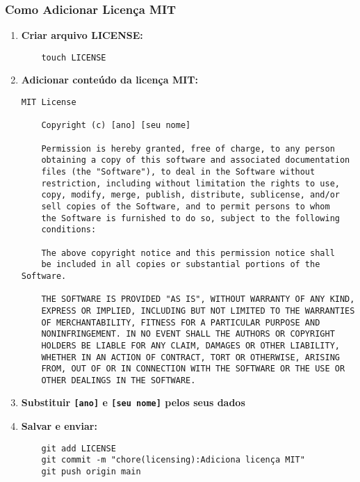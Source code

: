 \subsubsection{Como Adicionar Licença MIT}
\begin{enumerate}
    \item \textbf{Criar arquivo LICENSE:}
    \begin{verbatim}
    touch LICENSE
    \end{verbatim}
    
    \item \textbf{Adicionar conteúdo da licença MIT:}
    \begin{lstlisting}[caption={Licença MIT},label=lst:mit-license]
    MIT License

    Copyright (c) [ano] [seu nome]

    Permission is hereby granted, free of charge, to any person 
    obtaining a copy of this software and associated documentation 
    files (the "Software"), to deal in the Software without 
    restriction, including without limitation the rights to use, 
    copy, modify, merge, publish, distribute, sublicense, and/or 
    sell copies of the Software, and to permit persons to whom 
    the Software is furnished to do so, subject to the following 
    conditions:

    The above copyright notice and this permission notice shall 
    be included in all copies or substantial portions of the Software.

    THE SOFTWARE IS PROVIDED "AS IS", WITHOUT WARRANTY OF ANY KIND, 
    EXPRESS OR IMPLIED, INCLUDING BUT NOT LIMITED TO THE WARRANTIES 
    OF MERCHANTABILITY, FITNESS FOR A PARTICULAR PURPOSE AND 
    NONINFRINGEMENT. IN NO EVENT SHALL THE AUTHORS OR COPYRIGHT 
    HOLDERS BE LIABLE FOR ANY CLAIM, DAMAGES OR OTHER LIABILITY, 
    WHETHER IN AN ACTION OF CONTRACT, TORT OR OTHERWISE, ARISING 
    FROM, OUT OF OR IN CONNECTION WITH THE SOFTWARE OR THE USE OR 
    OTHER DEALINGS IN THE SOFTWARE.
    \end{lstlisting}
    
    \item \textbf{Substituir \texttt{[ano]} e \texttt{[seu nome]} pelos seus dados}
    
    \item \textbf{Salvar e enviar:}
    \begin{verbatim}
    git add LICENSE
    git commit -m "chore(licensing):Adiciona licença MIT"
    git push origin main
    \end{verbatim}
\end{enumerate}


